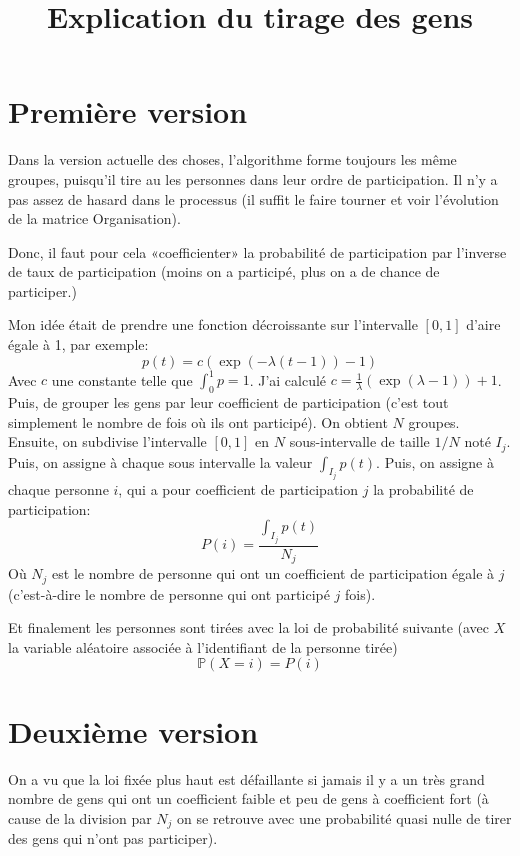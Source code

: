 \documentclass[11pt, a4paper]{article}
\title{Explication du tirage des gens}
\begin{document}

\maketitle

\section{Première version}
Dans la version actuelle des choses, l'algorithme forme toujours les même groupes, puisqu'il tire au
les personnes dans leur ordre de participation. Il n'y a pas assez de hasard dans le processus (il
suffit le faire tourner et voir l'évolution de la matrice Organisation).

Donc, il faut pour cela «coefficienter» la probabilité de participation par l'inverse de taux de
participation (moins on a participé, plus on a de chance de participer.)

Mon idée était de prendre une fonction décroissante sur l'intervalle $[0,1]$ d'aire égale à 1, par
exemple:
\[
    p(t) = c(\exp(-\lambda(t-1))-1)
    \]
Avec $c$ une constante telle que $\int_0^1 p = 1$. J'ai calculé $c = \frac{1}{\lambda}(\exp(\lambda
-1)) +1$.
Puis, de grouper les gens par leur coefficient de participation (c'est tout simplement le nombre de
fois où ils ont participé). On obtient $N$ groupes. Ensuite, on subdivise l'intervalle $[0, 1]$ en
$N$ sous-intervalle de taille $1/N$ noté $I_j$. Puis, on assigne à chaque sous intervalle la valeur
$\int_{I_j} p(t)$.
Puis, on assigne à chaque personne $i$, qui a pour coefficient de participation $j$ la probabilité de participation:
\[
    P(i)= \frac{\int_{I_j}p(t)}{N_j}
\]
Où $N_j$ est le nombre de personne qui ont un coefficient de participation égale à $j$ (c'est-à-dire
le nombre de personne qui ont participé $j$ fois).

Et finalement les personnes sont tirées avec la loi de probabilité suivante (avec $X$ la variable
aléatoire associée à l'identifiant de la personne tirée)
\[
    \mathbb{P}(X = i)= P(i)
\]

\section{Deuxième version}

On a vu que la loi fixée plus haut est défaillante si jamais il y a un très grand nombre de gens qui
ont un coefficient faible et peu de gens à coefficient fort (à cause de la division par $N_j$ on se
retrouve avec une probabilité quasi nulle de tirer des gens qui n'ont pas participer).
\end{document}
